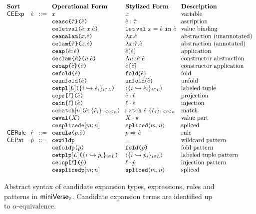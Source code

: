 \begin{figure}[p]
\hspace{-5px}$\arraycolsep=4pt\begin{array}{lllllll}
\textbf{Sort} & & & \textbf{Operational Form} & \textbf{Stylized Form} & \textbf{Description}\\
\mathsf{CEExp} & \ce & ::= & x & x & \text{variable}\\
&&& \aceasc{\ctau}{\ce} & \asc{\ce}{\ctau} & \text{ascription}\\
&&& \aceletsyn{x}{\ce}{\ce} & \letsyn{x}{\ce}{\ce} & \text{value binding}\\
&&& \aceanalam{x}{\ce} & \analam{x}{\ce} & \text{abstraction (unannotated)}\\
&&& \acelam{\ctau}{x}{\ce} & \lam{x}{\ctau}{\ce} & \text{abstraction (annotated)}\\
&&& \aceap{\ce}{\ce} & \ap{\ce}{\ce} & \text{application}\\
&&& \aceclam{\cekappa}{u}{\ce} & \clam{u}{\cekappa}{\ce} & \text{constructor abstraction}\\
&&& \acecap{\ce}{\cec} & \cAp{\ce}{\cec} & \text{constructor application}\\
&&& \aceanafold{\ce} & \fold{\ce} & \text{fold}\\
&&& \aceunfold{\ce} & \unfold{\ce} & \text{unfold}\\
&&& \acetpl{\labelset}{\mapschema{\ce}{i}{\labelset}} & \tpl{\mapschema{\ce}{i}{\labelset}} & \text{labeled tuple}\\
&&& \acepr{\ell}{\ce} & \prj{\ce}{\ell} & \text{projection}\\
&&& \aceanain{\ell}{\ce} & \inj{\ell}{\ce} & \text{injection}\\
&&& \acematchwithb{n}{\ce}{\seqschemaX{\urv}} & \matchwith{\ce}{\seqschemaX{\crv}} & \text{match}\\%
&&& \acemval{X} & \mval{X} & \text{value part}\\
&&& \acesplicede{m}{n} & \splicede{m}{n} & \text{spliced}\\%
\mathsf{CERule} & \crv & ::= & \acematchrule{p}{\ce} & \matchrule{p}{\ce} & \text{rule}\\
\mathsf{CEPat} & \cpv & ::= & \acewildp & \wildp & \text{wildcard pattern}\\
&&& \acefoldp{p} & \foldp{p} & \text{fold pattern}\\
&&& \acetplp{\labelset}{\mapschema{\cpv}{i}{\labelset}} & \tplp{\mapschema{\cpv}{i}{\labelset}} & \text{labeled tuple pattern}\\
&&& \aceinjp{\ell}{\cpv} & \injp{\ell}{\cpv} & \text{injection pattern}\\
&&& \acesplicedp{m}{n} & \splicedp{m}{n} & \text{spliced}
\end{array}$
\caption[Syntax of candidate expansion terms in $\miniVerseParam$]{Abstract syntax of candidate expansion types, expressions, rules and patterns in $\miniVerseParam$. Candidate expansion terms are identified up to $\alpha$-equivalence.}
\label{fig:P-candidate-terms}
\end{figure}

